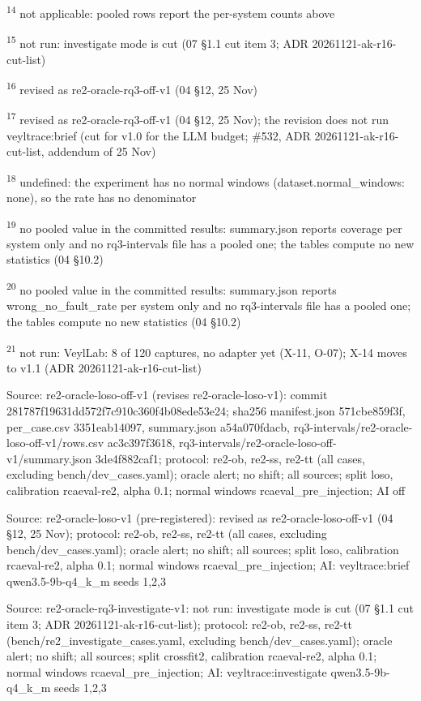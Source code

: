 \textsuperscript{14} not applicable: pooled rows report the per-system counts above\par
\textsuperscript{15} not run: investigate mode is cut (07 \S{}1.1 cut item 3; ADR 20261121-ak-r16-cut-list)\par
\textsuperscript{16} revised as re2-oracle-rq3-off-v1 (04 \S{}12, 25 Nov)\par
\textsuperscript{17} revised as re2-oracle-rq3-off-v1 (04 \S{}12, 25 Nov); the revision does not run veyltrace:brief (cut for v1.0 for the LLM budget; \#532, ADR 20261121-ak-r16-cut-list, addendum of 25 Nov)\par
\textsuperscript{18} undefined: the experiment has no normal windows (dataset.normal\_windows: none), so the rate has no denominator\par
\textsuperscript{19} no pooled value in the committed results: summary.json reports coverage per system only and no rq3-intervals file has a pooled one; the tables compute no new statistics (04 \S{}10.2)\par
\textsuperscript{20} no pooled value in the committed results: summary.json reports wrong\_no\_fault\_rate per system only and no rq3-intervals file has a pooled one; the tables compute no new statistics (04 \S{}10.2)\par
\textsuperscript{21} not run: VeylLab: 8 of 120 captures, no adapter yet (X-11, O-07); X-14 moves to v1.1 (ADR 20261121-ak-r16-cut-list)\par
\noindent Source: re2-oracle-loso-off-v1 (revises re2-oracle-loso-v1): commit 281787f19631dd572f7c910c360f4b08ede53e24; sha256 manifest.json 571cbe859f3f, per\_case.csv 3351eab14097, summary.json a54a070fdacb, rq3-intervals/\allowbreak{}re2-oracle-loso-off-v1/\allowbreak{}rows.csv ac3c397f3618, rq3-intervals/\allowbreak{}re2-oracle-loso-off-v1/\allowbreak{}summary.json 3de4f882caf1; protocol: re2-ob, re2-ss, re2-tt (all cases, excluding bench/\allowbreak{}dev\_cases.yaml); oracle alert; no shift; all sources; split loso, calibration rcaeval-re2, alpha 0.1; normal windows rcaeval\_pre\_injection; AI off\par
\noindent Source: re2-oracle-loso-v1 (pre-registered): revised as re2-oracle-loso-off-v1 (04 \S{}12, 25 Nov); protocol: re2-ob, re2-ss, re2-tt (all cases, excluding bench/\allowbreak{}dev\_cases.yaml); oracle alert; no shift; all sources; split loso, calibration rcaeval-re2, alpha 0.1; normal windows rcaeval\_pre\_injection; AI: veyltrace:brief qwen3.5-9b-q4\_k\_m seeds 1,2,3\par
\noindent Source: re2-oracle-rq3-investigate-v1: not run: investigate mode is cut (07 \S{}1.1 cut item 3; ADR 20261121-ak-r16-cut-list); protocol: re2-ob, re2-ss, re2-tt (bench/\allowbreak{}re2\_investigate\_cases.yaml, excluding bench/\allowbreak{}dev\_cases.yaml); oracle alert; no shift; all sources; split crossfit2, calibration rcaeval-re2, alpha 0.1; normal windows rcaeval\_pre\_injection; AI: veyltrace:investigate qwen3.5-9b-q4\_k\_m seeds 1,2,3\par
